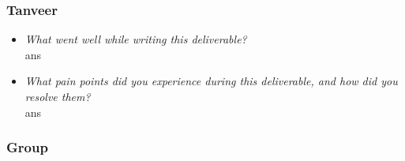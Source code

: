 \documentclass[12pt, titlepage]{article}
\begin{document}
\subsubsection*{Tanveer}
\begin{itemize}
  \item \textit{What went well while writing this deliverable?} \\ 
  
  ans

  \item \textit{What pain points did you experience during this deliverable, and how did you resolve them?}\\ 
  
  ans
\end{itemize}

\subsubsection*{Group}
\end{document}
